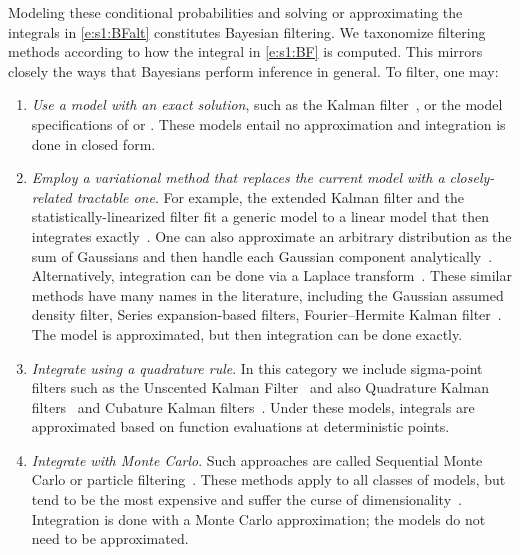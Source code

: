 Modeling these conditional probabilities and solving or approximating the integrals in \eqref{e:s1:BFalt} constitutes Bayesian filtering.  We taxonomize filtering methods according to how the integral in \eqref{e:s1:BF} is computed.  This mirrors closely the ways that Bayesians perform inference in general.  To filter, one may:

\begin{enumerate}
    \item \emph{Use a model with an exact solution}, such as the Kalman filter~\cite{Kal60,Kal61}, or the model specifications of \textcite{Ben81} or \textcite{Dau84,Dau86}.  These models entail no approximation and integration is done in closed form.
    
    \item \emph{Employ a variational method that replaces the current model with a closely-related tractable one}.  For example, the extended Kalman filter and the statistically-linearized filter fit a generic model to a linear model that then integrates exactly~\cite{Gel74,Sar13}.  One can also approximate an arbitrary distribution as the sum of Gaussians and then handle each Gaussian component analytically~\cite{Als72}.  Alternatively, integration can be done via a Laplace transform~\cite{Koy10}.  These similar methods have many names in the literature, including the Gaussian assumed density filter,
    Series expansion-based filters, Fourier--Hermite Kalman filter~\cite{Sar12}.  The model is approximated, but then integration can be done exactly.
    
    \item \emph{Integrate using a quadrature rule}.  In this category we include sigma-point filters such as the Unscented Kalman Filter~\cite{Jul97,Wan00,van04} and also Quadrature Kalman filters~\cite{Ito00,Ito00b} and  Cubature Kalman filters~\cite{Ara07,Ara09}.  Under these models, integrals are approximated based on function evaluations at deterministic points.
    
    \item \emph{Integrate with Monte Carlo}.  Such approaches are called Sequential Monte Carlo or particle filtering~\cite{Ham54,Gor93}.  These methods apply to all classes of models, but tend to be the most expensive and suffer the curse of dimensionality~\cite{Dau03}.  Integration is done with a Monte Carlo approximation; the models do not need to be approximated.
    
\end{enumerate}

